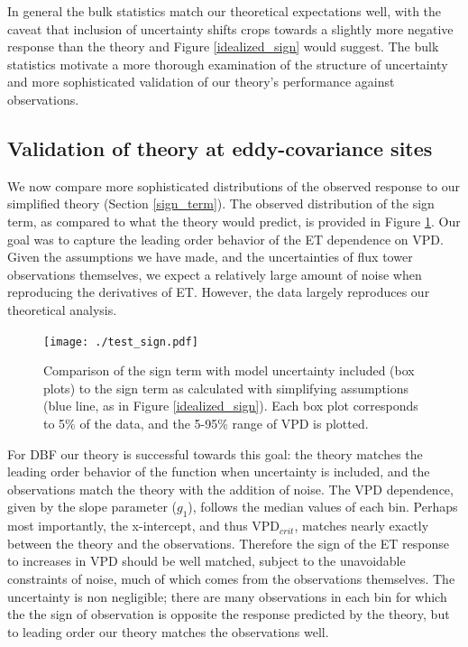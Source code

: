 \documentclass[draft,linenumbers]{agujournal}
\begin{document}
In general the bulk statistics match our theoretical expectations well, with the caveat that inclusion of uncertainty shifts crops towards a slightly more negative response than the theory and Figure \ref{idealized_sign} would suggest. The bulk statistics motivate a more thorough examination of the structure of uncertainty and more sophisticated validation of our theory's performance against observations. 

\subsection{Validation of theory at eddy-covariance sites}
\label{testing}
We now compare more sophisticated distributions of the observed response to our simplified theory (Section \ref{sign_term}). The observed distribution of the sign term, as compared to what the theory would predict, is provided in Figure \ref{test_sign}. Our goal was to capture the leading order behavior of the ET dependence on VPD. Given the assumptions we have made, and the uncertainties of flux tower observations themselves, we expect a relatively large amount of noise when reproducing the derivatives of ET. However, the data largely reproduces our theoretical analysis.

\begin{figure}
\centering
\centerline{\texttt{[image: ./test\_sign.pdf]}}
\caption{Comparison of the sign term with model uncertainty included (box plots) to the sign term as calculated with simplifying assumptions (blue line, as in Figure \ref{idealized_sign}). Each box plot corresponds to 5\% of the data, and the 5-95\% range of VPD is plotted.}
\label{test_sign}
\end{figure}

For DBF our theory is successful towards this goal: the theory matches the leading order behavior of the function when uncertainty is included, and the observations match the theory with the addition of noise. The VPD dependence, given by the slope parameter ($g_1$), follows the median values of each bin. Perhaps most importantly, the x-intercept, and thus VPD$_{crit}$, matches nearly exactly between the theory and the observations. Therefore the sign of the ET response to increases in VPD should be well matched, subject to the unavoidable constraints of noise, much of which comes from the observations themselves. The uncertainty is non negligible; there are many observations in each bin for which the the sign of observation is opposite the response predicted by the theory, but to leading order our theory matches the observations well.
\end{document}
